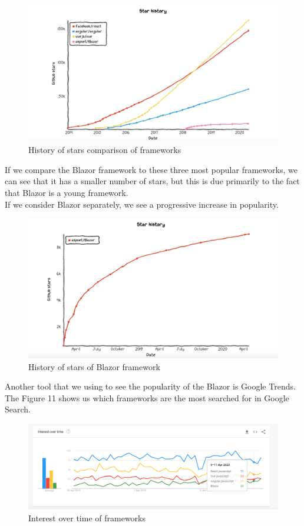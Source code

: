 \documentclass{scrartcl}
\begin{document}
 \begin{figure}[H]
\centering
\includegraphics[width=150mm]{graph/star-history-all.JPG}
\caption{History of stars comparison of frameworks}
\label{blabla}
\end{figure}

If we compare the Blazor framework to these three most popular frameworks, we can see that it has a smaller number of stars, but this is due primarily to the fact that Blazor is a young framework.\\
If we consider Blazor separately, we see a progressive increase in popularity.

 \begin{figure}[H]
\centering
\includegraphics[width=150mm]{graph/star-history-blazor.JPG}
\caption{History of stars of Blazor framework}
\label{blabla}
\end{figure}


Another tool that we using to see the popularity of the Blazor is Google Trends. The Figure 11 shows us which frameworks are the most searched for in Google Search. \cite{interest-over-time}
 \begin{figure}[H]
\centering
\includegraphics[width=150mm]{graph/interest-all.JPG}
\caption{Interest over time of frameworks}
\label{blabla}
\end{figure}
\end{document}
